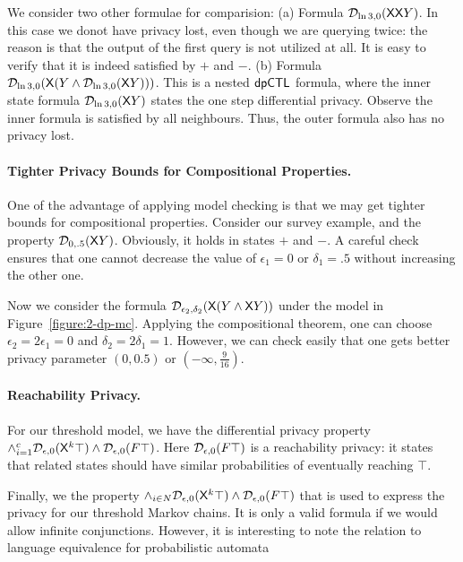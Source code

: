 We consider two other formulae for comparision:
(a) Formula $\mathcal{D}_{{\ln 3}, {0}} (\mathsf{X} \mathsf{X} Y)$. In this case we donot have privacy lost, even though we are querying twice: the reason is that the output of the first query is not utilized at all. It is easy to verify that it is indeed satisfied by $+$ and $-$.
(b) Formula $\mathcal{D}_{{\ln 3}, {0}} (\mathsf{X} (Y\wedge \mathcal{D}_{{\ln 3}, {0}}(\mathsf{X} Y)))$. This is a nested $\textsf{dpCTL}$ formula, where the inner state formula $\mathcal{D}_{{\ln 3}, {0}}(\mathsf{X} Y)$ states the one step differential privacy. Observe the inner formula is satisfied by all neighbours. Thus, the outer formula also has no privacy lost.

\paragraph{Tighter Privacy Bounds for Compositional Properties.}
One of the advantage of applying model checking is that we may get tighter bounds for compositional properties. Consider our survey example, and the property $\mathcal{D}_{{0}, {.5}} (\mathsf{X} Y)$. Obviously, it holds in states $+$ and $-$. A careful check ensures that one cannot decrease the value of $\epsilon_1=0$ or $\delta_1=.5$ without increasing the other one.


Now we consider the formula $\mathcal{D}_{{\epsilon_2}, {\delta_2}} (\mathsf{X} (Y\wedge \mathsf{X} Y))$ under the model in Figure~\ref{figure:2-dp-mc}. Applying the compositional theorem, one can choose $\epsilon_2=2\epsilon_1=0$ and $\delta_2=2\delta_1=1$. However, we can check easily that one gets better privacy parameter $(0,0.5)$ or $(-\infty,\frac{9}{16})$. 

\paragraph{Reachability Privacy.}
For our threshold  model, we have the differential privacy property $\wedge_{i=1}^{c} \mathcal{D}_{{\epsilon}, {0}}(\mathsf{X}^k \top) \wedge \mathcal{D}_{{\epsilon}, {0}}(F \top)$. Here $\mathcal{D}_{{\epsilon}, {0}}(F \top)$ is a reachability privacy: it states that related states should have similar probabilities of eventually reaching $\top$.

Finally, we the property
$\wedge_{i\in N} \mathcal{D}_{{\epsilon}, {0}}(\mathsf{X}^k \top) \wedge \mathcal{D}_{{\epsilon}, {0}}(F \top)$ that is used to express the privacy for our threshold Markov chains. It is only a valid formula if we would allow infinite conjunctions. However, it is interesting to note the relation to language equivalence for probabilistic automata


